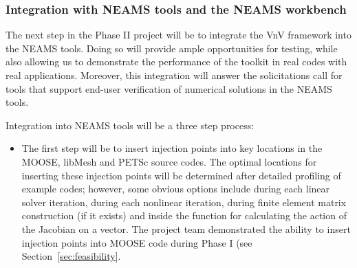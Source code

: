 \subsubsection{Integration with NEAMS tools and the NEAMS workbench} 

The next step in the Phase II project will be to integrate the VnV framework into the NEAMS 
tools. Doing so will provide ample opportunities for testing, while also allowing us to demonstrate the performance of the toolkit in real codes with
real applications. Moreover, this integration will answer the solicitations call for tools that support end-user verification of numerical solutions in the NEAMS tools. 

Integration into NEAMS tools will be a three step process:

\begin{itemize}
 \item The first step will be to insert injection points into key locations in the MOOSE, libMesh and PETSc source codes. The optimal locations for 
 inserting these injection points will be determined after detailed profiling of example codes; however, some obvious options include during each linear 
 solver iteration, during each nonlinear iteration, during finite element matrix construction (if it exists) and inside the function for calculating the action of the Jacobian
 on a vector. The project team demonstrated the ability to insert injection points into MOOSE code during Phase I (see Section~\ref{sec:feasibility}. 
 

\end{itemize}
